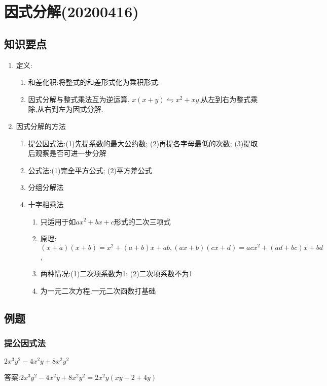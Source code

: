 \documentclass[cn,blue]{elegantbook}
\begin{document}
\chapter{因式分解(20200416)}%
\label{cha:因式分解}
\section{知识要点}%
\label{sec:知识要点}
\begin{enumerate}
    \item 定义:
        \begin{enumerate}
            \item 和差化积:将整式的和差形式化为乘积形式.
            \item 因式分解与整式乘法互为逆运算. \(x(x+y) \leftrightharpoons x^2+xy \),从左到右为整式乘除,从右到左为因式分解.
        \end{enumerate}
    \item 因式分解的方法
        \begin{enumerate}
            \item 提公因式法:(1)先提系数的最大公约数; (2)再提各字母最低的次数; (3)提取后观察是否可进一步分解
            \item 公式法:(1)完全平方公式; (2)平方差公式
            \item 分组分解法
            \item 十字相乘法
                \begin{enumerate}
                    \item 只适用于如\(ax^2+bx+c\)形式的二次三项式
                    \item 原理:\((x+a)(x+b)=x^2+(a+b)x+ab, (ax+b)(cx+d)=acx^2+(ad+bc)x+bd\),
                    \item 两种情况:(1)二次项系数为1; (2)二次项系数不为1
                    \item 为一元二次方程,一元二次函数打基础
                \end{enumerate}
        \end{enumerate}
\end{enumerate}
\section{例题}%
\label{sec:例题}
\subsection{提公因式法}%
\begin{problem}
    \(2x^3y^2 -4x^2y +8x^2y^2\)
\end{problem}
\begin{solution}
    答案:\(2x^3y^2 -4x^2y +8x^2y^2=2x^2y(xy-2+4y)\)\\
\end{solution}
\end{document}
